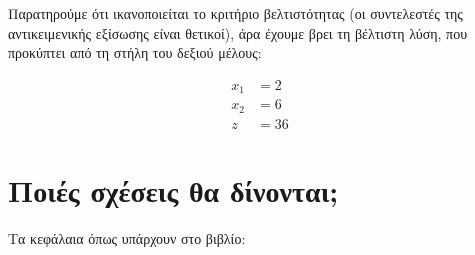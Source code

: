 \documentclass[11pt,a4paper,notitlepage,fleqn]{article}
\begin{document}
Παρατηρούμε ότι ικανοποιείται το κριτήριο βελτιστότητας (οι συντελεστές της αντικειμενικής
εξίσωσης είναι θετικοί), άρα έχουμε βρει τη βέλτιστη λύση, που προκύπτει από τη στήλη του
δεξιού μέλους:

\[
\boxed{\begin{array}{rl}
	x_1 &= 2 \\
	x_2 &= 6 \\
	z   &= 36
	\end{array}}
\]

\section{Ποιές σχέσεις θα δίνονται;}

Τα κεφάλαια όπως υπάρχουν στο βιβλίο:
\newcommand{\nlc}{\displaybreak[2] \\[3ex]}
\end{document}
